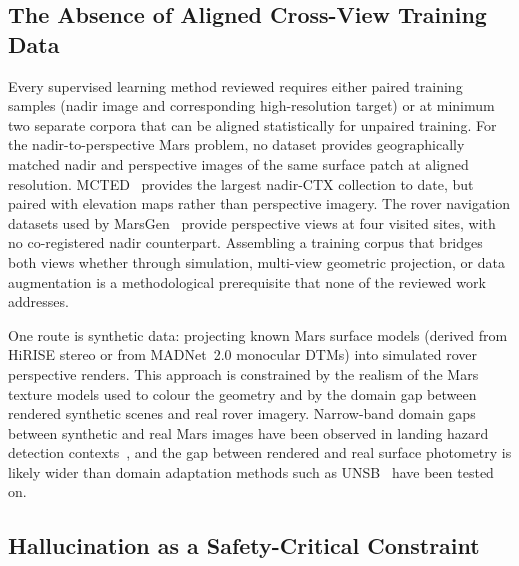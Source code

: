 \documentclass[10pt,journal]{IEEEtran}
\begin{document}
\subsection{The Absence of Aligned Cross-View Training Data}
\label{subsec:data-gap}

Every supervised learning method reviewed requires either paired training samples
(nadir image and corresponding high-resolution target) or at minimum two separate
corpora that can be aligned statistically for unpaired training. For the
nadir-to-perspective Mars problem, no dataset provides geographically matched
nadir and perspective images of the same surface patch at aligned resolution.
MCTED~\cite{osadnik2025mcted} provides the largest nadir-CTX collection to date,
but paired with elevation maps rather than perspective imagery. The rover
navigation datasets used by MarsGen~\cite{li2025martian} provide perspective
views at four visited sites, with no co-registered nadir counterpart. Assembling
a training corpus that bridges both views whether through simulation, multi-view
geometric projection, or data augmentation is a methodological prerequisite
that none of the reviewed work addresses.

One route is synthetic data: projecting known Mars surface models (derived from
HiRISE stereo or from MADNet~2.0 monocular DTMs) into simulated rover
perspective renders. This approach is constrained by the realism of the Mars
texture models used to colour the geometry and by the domain gap between rendered
synthetic scenes and real rover imagery. Narrow-band domain gaps between
synthetic and real Mars images have been observed in landing hazard detection
contexts~\cite{serrano2013hirise}, and the gap between rendered and real surface
photometry is likely wider than domain adaptation methods such as
UNSB~\cite{kim2024unsb} have been tested on.

\subsection{Hallucination as a Safety-Critical Constraint}
\label{subsec:hallucination-challenge}
\end{document}
